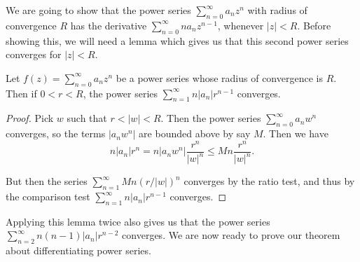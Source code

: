 We are going to show that the power series $\sum_{n = 0}^{\infty} a_n z^n$ with radius of convergence $R$ has the derivative $\sum_{n = 0}^{\infty} n a_n z^{n - 1}$, whenever $|z| < R$.
Before showing this, we will need a lemma which gives us that this second power series converges for $|z| < R$.


\begin{lemma}
	Let $f(z) = \sum_{n = 0}^{\infty} a_n z^n$ be a power series whose radius of convergence is $R$. 
	Then if $0 < r < R$, the power series $\sum_{n = 1}^{\infty} n |a_n|r^{n - 1}$ converges.
\end{lemma}
\begin{proof}
	Pick $w$ such that $r < |w| < R$. Then the power series $\sum_{n = 0}^{\infty} a_n w^n$ converges, so the terms $|a_n w^n|$ are bounded above by say $M$. Then we have
	$$
	n|a_n|r^n = n|a_n w^n| \frac{r^n}{|w|^n} \leq M n \frac{r^n}{|w|^n}.
	$$

	But then the series $\sum_{n = 1}^{\infty} Mn (r/|w|)^n$ converges by the ratio test, and thus by the comparison test $\sum_{n = 1}^{\infty} n |a_n| r^{n - 1}$ converges.
\end{proof}

Applying this lemma twice also gives us that the power series
$
\sum_{n = 2}^{\infty} n(n - 1) |a_n| r^{n - 2}
$
converges. We are now ready to prove our theorem about differentiating power series.



